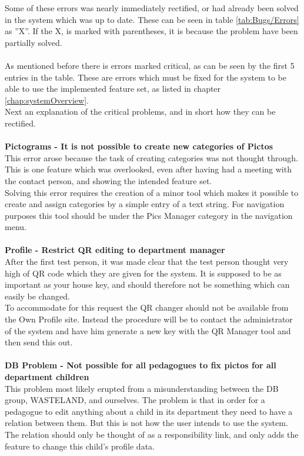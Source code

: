 Some of these errors was nearly immediately rectified, or had already been solved in the system which was up to date. These can be seen in table \ref{tab:Bugs/Errors} as ''X''. If the X, is marked with parentheses, it is because the problem have been partially solved.\\
\\
As mentioned before there is errors marked critical, as can be seen by the first 5 entries in the table. These are errors which must be fixed for the system to be able to use the implemented feature set, as listed in chapter \vref{chap:systemOverview}.\\
Next an explanation of the critical problems, and in short how they can be rectified.\\
\\
\textbf{Pictograms - It is not possible to create new categories of Pictos}\\
This error arose because the task of creating categories was not thought through. This is one feature which was overlooked, even after having had a meeting with the contact person, and showing the intended feature set.\\
Solving this error requires the creation of a minor tool which makes it possible to create and assign categories by a simple entry of a text string. For navigation purposes this tool should be under the Pics Manager category in the navigation menu.\\
\\
\textbf{Profile - Restrict QR editing to department manager}\\
After the first test person, it was made clear that the test person thought very high of QR code which they are given for the system. It is supposed to be as important as your house key, and should therefore not be something which can easily be changed.\\
To accommodate for this request the QR changer should not be available from the Own Profile site. Instead the procedure will be to contact the administrator of the system and have him generate a new key with the QR Manager tool and then send this out.\\
\\
\textbf{DB Problem - Not possible for all pedagogues to fix pictos for all department children}\\
This problem most likely erupted from a misunderstanding between the DB group, WASTELAND, and ourselves. The problem is that in order for a pedagogue to edit anything about a child in its department they need to have a relation between them. But this is not how the user intends to use the system. The relation should only be thought of as a responsibility link, and only adds the feature to change this child's profile data.\\
